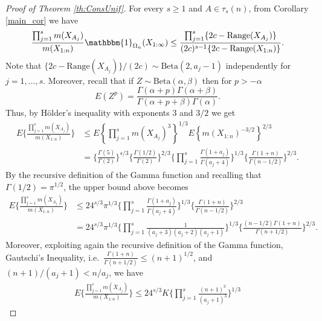 \documentclass[12pt]{article}
\begin{document}
\begin{proof}[Proof of Theorem \ref{th:ConsUnif}]
For every $s \geq 1$ and $A \in \tau_s(n)$, from Corollary \ref{main_cor} we have
\[
\frac{\prod_{j=1}^{s} m(X_{A_j})}{m(X_{1:n})} \mathbbm{1}_{\Omega_n}(X_{1:\infty}) \le \frac{\prod_{j=1}^{s} \{2c-\text{Range}(X_{A_j})\}}{(2c)^{s-1} \{ 2c-\text{Range}(X_{1:n})\}}.
\]
Note that $\{2c-\text{Range}(X_{A_j})\}/(2c) \sim \text{Beta}(2,a_j-1)$ independently for $j=1,\ldots,s$. %
Moreover, recall that if $Z \sim \text{Beta}(\alpha,\beta)$ then for $p > - \alpha$
\begin{equation*}
E(Z^p) = \frac{\Gamma(\alpha+p) \Gamma(\alpha+\beta)}{\Gamma(\alpha+p+\beta) \Gamma(\alpha)}.
\end{equation*}
Thus, by H\"{o}lder's inequality with exponents $3$ and $3/2$ we get
\begin{align*}
E\bigg\{\frac{\prod_{j=1}^{s} m(X_{A_j})}{m(X_{1:n})} \bigg\} & \leq E\left\{\prod_{j=1}^{s} m(X_{A_j})^3 \right\}^{1/3}E\left\{ m(X_{1:n}) ^{-3/2}\right\}^{2/3} \\
&= \bigg\{\frac{\Gamma(5)}{\Gamma(2)}\bigg\}^{s/3} \bigg\{\frac{\Gamma(1/2)}{\Gamma(2)}\bigg\}^{2/3} \bigg\{\prod_{j=1}^{s} \frac{\Gamma(1+a_j)}{\Gamma(a_j+4)}\bigg\}^{1/3} \bigg\{\frac{\Gamma(1+n)}{\Gamma (n-1/2 )}\bigg\}^{2/3}.
\end{align*}
By the recursive definition of the Gamma function and recalling that $\Gamma(1/2)=\pi^{1/2}$, the upper bound above becomes
\begin{align*}
E\bigg\{\frac{\prod_{j=1}^{s} m(X_{A_j})}{m(X_{1:n})} \bigg\} &\leq	24^{s/3} \pi^{1/3} \bigg\{\prod_{j=1}^{s} \frac{\Gamma(1+a_j)}{\Gamma(a_j+4)}\bigg\}^{1/3} \bigg\{\frac{\Gamma(1+n)}{\Gamma(n-1/2)}\bigg\}^{2/3}\\
&= 24^{s/3} \pi^{1/3} \bigg\{\prod_{j=1}^{s} \frac{1}{(a_j+3)(a_j+2)(a_j+1)}\bigg\}^{1/3} \bigg\{ \frac{(n-1/2)\Gamma(1+n)}{\Gamma(n+1/2)} \bigg\}^{2/3}.
\end{align*}
Moreover, exploiting again the recursive definition of the Gamma function, Gautschi's Inequality, i.e.\ $\frac{\Gamma(1+n)}{\Gamma(n+1/2)} \le (n+1)^{1/2}$, and 
$(n+1)/(a_j+1)<n/a_j$, we have
\begin{align*}
E\bigg\{\frac{\prod_{j=1}^{s} m(X_{A_j})}{m(X_{1:n})} \bigg\} \le 24^{s/3} K \bigg\{\prod_{j=1}^{s} \frac{(n+1)^3}{(a_j+1)^3}\bigg\}^{1/3}

\end{align*}
\end{proof}
\end{document}
